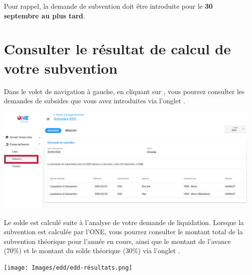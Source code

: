 \begin{attention}\normalfont
Pour rappel, la demande de subvention doit être introduite pour le \textcolor{rouge}{\textbf{30 septembre au plus tard}}.
\end{attention}

\section{Consulter le résultat de calcul de votre subvention}
Dans le volet de navigation à gauche, en cliquant sur , vous pourrez consulter les demandes de subsides que vous avez introduites via l'onglet .

\vspace{4mm}
\centerline{\includegraphics[width=15cm]{Images/edd/edd-subsides.png}}

Le solde est calculé suite à l’analyse de votre demande de liquidation. Lorsque la subvention est calculée par l’ONE, vous pourrez consulter le  montant total de la subvention théorique pour l’année en cours, ainsi que le montant de l’avance (70\%) et le montant du solde théorique (30\%) via l'onglet . 

\vspace{4mm}
\centerline{\texttt{[image: Images/edd/edd-résultats.png]}}

